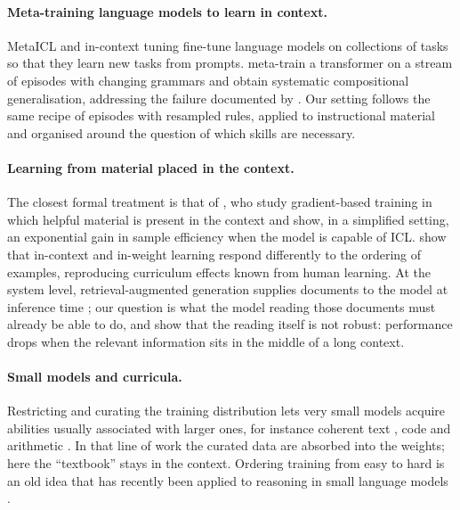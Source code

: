 \documentclass[11pt]{article}
\begin{document}
\paragraph{Meta-training language models to learn in context.}
MetaICL \citep{min2022metaicl} and in-context tuning \citep{chen2022tuning} fine-tune language models on collections of tasks so that they learn new tasks from prompts.
\citet{lake2023mlc} meta-train a transformer on a stream of episodes with changing grammars and obtain systematic compositional generalisation, addressing the failure documented by \citet{lake2018scan}.
Our setting follows the same recipe of episodes with resampled rules, applied to instructional material and organised around the question of which skills are necessary.

\paragraph{Learning from material placed in the context.}
The closest formal treatment is that of \citet{zhu2025context}, who study gradient-based training in which helpful material is present in the context and show, in a simplified setting, an exponential gain in sample efficiency when the model is capable of ICL.
\citet{russin2025interplay} show that in-context and in-weight learning respond differently to the ordering of examples, reproducing curriculum effects known from human learning.
At the system level, retrieval-augmented generation supplies documents to the model at inference time \citep{lewis2020rag}; our question is what the model reading those documents must already be able to do, and \citet{liu2023lost} show that the reading itself is not robust: performance drops when the relevant information sits in the middle of a long context.

\paragraph{Small models and curricula.}
Restricting and curating the training distribution lets very small models acquire abilities usually associated with larger ones, for instance coherent text \citep{eldan2023tinystories}, code \citep{gunasekar2023textbooks} and arithmetic \citep{lee2023arithmetic}.
In that line of work the curated data are absorbed into the weights; here the ``textbook'' stays in the context.
Ordering training from easy to hard is an old idea \citep{elman1993starting,bengio2009curriculum} that has recently been applied to reasoning in small language models \citep{fu2025easy}.
\end{document}
